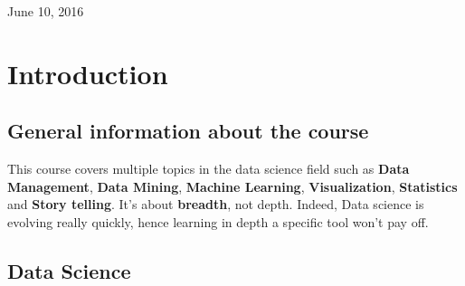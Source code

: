 \documentclass[a4paper,11pt,twoside]{article}
\begin{document}
\begin{titlepage}
\begin{center}


{\Large June 10, 2016}\\[1cm] %
%
\vfill %

\end{center}
\end{titlepage}



\pagestyle{fancy}
\newpage
\tableofcontents 

\baselineskip=16pt

\newpage




\section{Introduction}

\subsection{General information about the course}

This course covers multiple topics in the data science field such as {\bf Data Management}, {\bf Data Mining}, {\bf Machine Learning}, {\bf Visualization}, {\bf Statistics} and {\bf Story telling}. It's about {\bf breadth}, not depth. Indeed, Data science is evolving really quickly, hence learning in depth a specific tool won't pay off. 

\subsection{Data Science}
\end{document}
